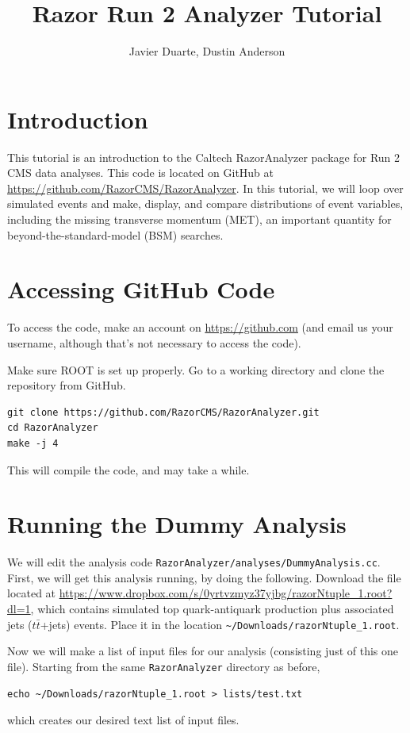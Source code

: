 \documentclass{article}
\begin{document}
\title{Razor Run 2 Analyzer Tutorial}
\author{Javier Duarte, Dustin Anderson}
\maketitle

\tableofcontents

\section{Introduction}
This tutorial is an introduction to the Caltech RazorAnalyzer package for Run
2 CMS data analyses. This code is located on GitHub at
\url{https://github.com/RazorCMS/RazorAnalyzer}. In this tutorial, we
will loop over simulated events and make, display, and compare distributions of event
variables, including the missing transverse momentum (MET), an
important quantity for beyond-the-standard-model (BSM) searches.

\section{Accessing GitHub Code}
To access the code, make an account on \url{https://github.com} (and
email us your username, although that's not necessary to access the
code).

Make sure \textsc{ROOT} is set up properly. Go to a working directory and clone the repository from GitHub.
\begin{verbatim}
git clone https://github.com/RazorCMS/RazorAnalyzer.git
cd RazorAnalyzer
make -j 4
\end{verbatim}
This will compile the code, and may take a while.


\section{Running the Dummy Analysis}
We will edit the analysis code
\texttt{RazorAnalyzer/analyses/DummyAnalysis.cc}. First, we will get
this analysis running, by doing the following. Download the file
located at
\url{https://www.dropbox.com/s/0yrtvzmyz37yjbg/razorNtuple_1.root?dl=1},
which contains simulated top quark-antiquark production plus
associated jets ($t\bar{t}$+jets)
events. Place it in the location \texttt{\textasciitilde/Downloads/razorNtuple\_1.root}.

Now we will make a list of input files for our analysis (consisting
just of this one file). Starting from the same \texttt{RazorAnalyzer}
directory as before,
\begin{verbatim}
echo ~/Downloads/razorNtuple_1.root > lists/test.txt
\end{verbatim}
which creates our desired text list of input files.
\end{document}
